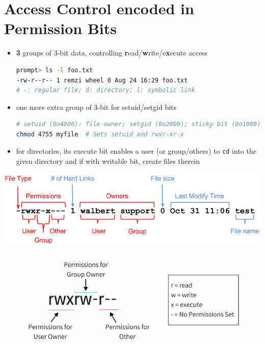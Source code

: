 \section*{Access Control encoded in Permission Bits}
\begin{itemize}
\item \textbf{3} groups of 3-bit data, controlling \textbf{r}ead/\textbf{w}rite/e\textbf{x}ecute access
\begin{lstlisting}[language=bash]
prompt> ls -l foo.txt
-rw-r--r-- 1 remzi wheel 0 Aug 24 16:29 foo.txt
# -: regular file; d: directory; l: symbolic link
\end{lstlisting}
\item one more extra group of 3-bit for setuid/setgid bits
\begin{lstlisting}[language=bash]
# setuid (0o4000): file owner; setgid (0o2000); sticky bit (0o1000)
chmod 4755 myfile  # Sets setuid and rwxr-xr-x
\end{lstlisting}
\item for directories, its execute bit enables a user (or group/others) to \texttt{cd} into the given directory and if with writable bit, create files therein
\end{itemize}
\begin{minipage}{.5\linewidth}
  \includegraphics[width=\linewidth]{imgs/file_perm2}
\end{minipage}
\begin{minipage}{.5\linewidth}
  \includegraphics[width=\linewidth]{imgs/file_perm1}
\end{minipage}
